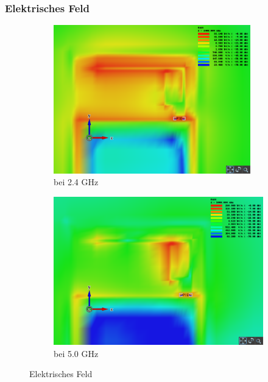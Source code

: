 \subsubsection{Elektrisches Feld}
\begin{figure}[htbp]
	\begin{center}
		\begin{subfigure}[t]{0.49\textwidth}
			\begin{center}
				\includegraphics[width=0.94\textwidth]{../fig/plt/crazy_stuff_l4_pcb_v2c_laptop_1a_105_2ghz4_3d_electric_field_xy.png}
				\caption{bei 2.4 GHz}
				\label{fig:electricfield_2_4}
			\end{center}
		\end{subfigure}
		\begin{subfigure}[t]{0.49\textwidth}
			\begin{center}
				\includegraphics[width=1\textwidth]{../fig/plt/crazy_stuff_l4_pcb_v2c_laptop_1a_105_5ghz_3d_electric_field_xy.png}
				\caption{bei 5.0 GHz}
				\label{fig:electricfield_5_0}
			\end{center}
		\end{subfigure}
		\caption{Elektrisches Feld}
		\label{fig:electricfield}
	\end{center}
\end{figure}

